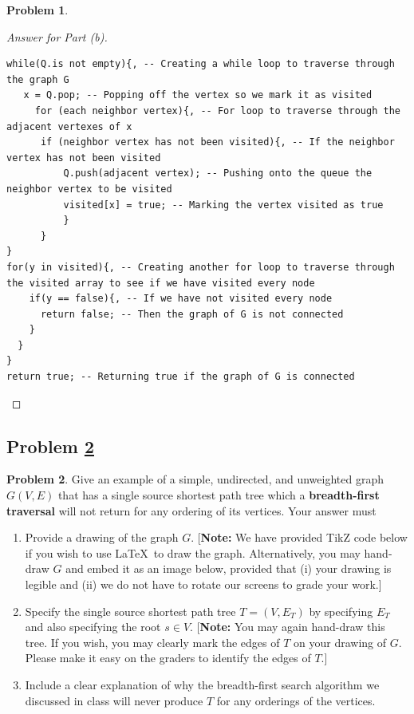 \documentclass[11pt]{article}
\theoremstyle{definition}
\theoremstyle{definition}
\newtheorem{required}{Problem}
\theoremstyle{definition}
\begin{document}
\begin{required}
\begin{enumerate}[label=(\alph*)]
\begin{proof}[Answer for Part (b)]
\begin{center}
\begin{lstlisting}
while(Q.is not empty){, -- Creating a while loop to traverse through the graph G 
   x = Q.pop; -- Popping off the vertex so we mark it as visited 
     for (each neighbor vertex){, -- For loop to traverse through the adjacent vertexes of x 
      if (neighbor vertex has not been visited){, -- If the neighbor vertex has not been visited
          Q.push(adjacent vertex); -- Pushing onto the queue the neighbor vertex to be visited
          visited[x] = true; -- Marking the vertex visited as true
          }
      } 
}
for(y in visited){, -- Creating another for loop to traverse through the visited array to see if we have visited every node
    if(y == false){, -- If we have not visited every node
      return false; -- Then the graph of G is not connected
    }
  }
}
return true; -- Returning true if the graph of G is connected
\end{lstlisting}
\end{center}
\end{proof}
\end{enumerate}
\end{required}






\newpage
\subsection{Problem \ref{DFS2}} 
\begin{required} \label{DFS2}
Give an example of a simple, undirected, and unweighted graph $G(V, E)$ that has a single source shortest path tree which a \textbf{breadth-first traversal} will not return for any ordering of its vertices. 
    Your answer must
    \begin{enumerate}[label=(\alph*)]
    	\item Provide a drawing of the graph $G$. [\textbf{Note:} We have provided TikZ code below if you wish to use \LaTeX \ to draw the graph. Alternatively, you may hand-draw $G$ and embed it as an image below, provided that (i) your drawing is legible and (ii) we do not have to rotate our screens to grade your work.] %
    	\item Specify the single source shortest path tree $T = (V,E_T)$ by specifying $E_T$ and also specifying the root $s \in V$. [\textbf{Note:} You may again hand-draw this tree. If you wish, you may clearly mark the edges of $T$ on your drawing of $G$. Please make it easy on the graders to identify the edges of $T$.] %
    	\item Include a clear explanation of why the breadth-first search algorithm we discussed in class will never produce $T$ for any orderings of the vertices.
    \end{enumerate}

\end{required}
\end{document}
